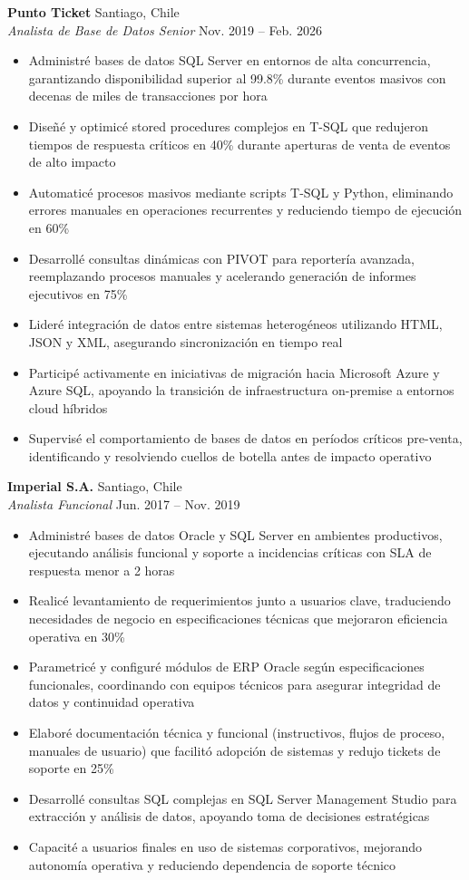 \documentclass[11pt,letterpaper]{article}
\begin{document}
\textbf{Punto Ticket} \hfill Santiago, Chile\\
\textit{Analista de Base de Datos Senior} \hfill Nov. 2019 – Feb. 2026
\begin{itemize}
  \item Administré bases de datos SQL Server en entornos de alta concurrencia, garantizando disponibilidad superior al 99.8\% durante eventos masivos con decenas de miles de transacciones por hora
  \item Diseñé y optimicé stored procedures complejos en T-SQL que redujeron tiempos de respuesta críticos en 40\% durante aperturas de venta de eventos de alto impacto
  \item Automaticé procesos masivos mediante scripts T-SQL y Python, eliminando errores manuales en operaciones recurrentes y reduciendo tiempo de ejecución en 60\%
  \item Desarrollé consultas dinámicas con PIVOT para reportería avanzada, reemplazando procesos manuales y acelerando generación de informes ejecutivos en 75\%
  \item Lideré integración de datos entre sistemas heterogéneos utilizando HTML, JSON y XML, asegurando sincronización en tiempo real
  \item Participé activamente en iniciativas de migración hacia Microsoft Azure y Azure SQL, apoyando la transición de infraestructura on-premise a entornos cloud híbridos
  \item Supervisé el comportamiento de bases de datos en períodos críticos pre-venta, identificando y resolviendo cuellos de botella antes de impacto operativo
\end{itemize}
\vspace{2pt}
\textbf{Imperial S.A.} \hfill Santiago, Chile\\
\textit{Analista Funcional} \hfill Jun. 2017 – Nov. 2019
\begin{itemize}
  \item Administré bases de datos Oracle y SQL Server en ambientes productivos, ejecutando análisis funcional y soporte a incidencias críticas con SLA de respuesta menor a 2 horas
  \item Realicé levantamiento de requerimientos junto a usuarios clave, traduciendo necesidades de negocio en especificaciones técnicas que mejoraron eficiencia operativa en 30\%
  \item Parametricé y configuré módulos de ERP Oracle según especificaciones funcionales, coordinando con equipos técnicos para asegurar integridad de datos y continuidad operativa
  \item Elaboré documentación técnica y funcional (instructivos, flujos de proceso, manuales de usuario) que facilitó adopción de sistemas y redujo tickets de soporte en 25\%
  \item Desarrollé consultas SQL complejas en SQL Server Management Studio para extracción y análisis de datos, apoyando toma de decisiones estratégicas
  \item Capacité a usuarios finales en uso de sistemas corporativos, mejorando autonomía operativa y reduciendo dependencia de soporte técnico
\end{itemize}
\end{document}
